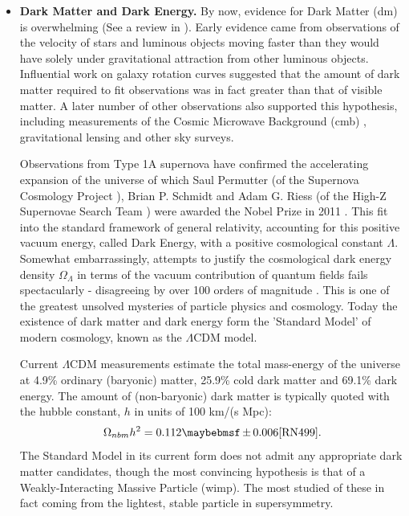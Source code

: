 \begin{itemize}
\item \textbf{Dark Matter and Dark Energy.} By now, evidence for Dark Matter (\acrshort{dm}) is overwhelming (See a review in \cite{RN501}). Early evidence came from observations of the velocity of stars and luminous objects moving faster than they would have solely under gravitational attraction from other luminous objects. Influential work on galaxy rotation curves \cite{RN502,RN503} suggested that the amount of dark matter required to fit observations was in fact greater than that of visible matter. A later number of other observations also supported this hypothesis, including measurements of the Cosmic Microwave Background (\acrshort{cmb}) \cite{RN504}, gravitational lensing and other sky surveys. 

Observations from Type 1A supernova \cite{RN512, RN510, RN511, RN506, RN507} have confirmed the accelerating expansion of the universe of which Saul Permutter (of the Supernova Cosmology Project \cite{RN509}), Brian P. Schmidt and Adam G. Riess (of the High-Z Supernovae Search Team \cite{RN508}) were awarded the Nobel Prize in 2011 \cite{RN505}. This fit into the standard framework of general relativity, accounting for this positive vacuum energy, called Dark Energy, with a positive cosmological constant $\Lambda$. Somewhat embarrassingly, attempts to justify the cosmological dark energy density $\Omega_{\Lambda}$ in terms of the vacuum contribution of quantum fields fails spectacularly - disagreeing by over 100 orders of magnitude \cite{RN500}. This is one of the greatest unsolved mysteries of particle physics and cosmology. Today the existence of dark matter and dark energy form the 'Standard Model' of modern cosmology, known as the $\Lambda$CDM model.

Current $\Lambda$CDM measurements \cite{RN499} estimate the total mass-energy of the universe at 4.9\% ordinary (baryonic) matter, 25.9\% cold dark matter and 69.1\% dark energy. The amount of (non-baryonic) dark matter is typically quoted with the hubble constant, $h$ in units of 100 km/(s Mpc):
\begin{equation}
\Omega_{nbm} h^2 = 0.112 \pm 0.006 \text{\cite{RN499}}.
\label{eqn:planckrelic}
\end{equation}
The Standard Model in its current form does not admit any appropriate dark matter candidates, though the most convincing hypothesis is that of a Weakly-Interacting Massive Particle (\acrshort{wimp}). The most studied of these in fact coming from the lightest, stable particle in supersymmetry.


\end{itemize}
